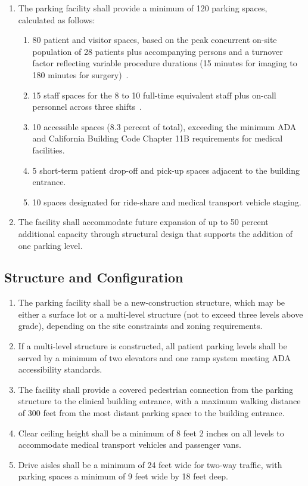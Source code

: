 \begin{enumerate}[label=(\alph*)]
\item The parking facility shall provide a minimum of 120 parking spaces,
  calculated as follows:
  \begin{enumerate}[label=(\arabic*)]
  \item 80 patient and visitor spaces, based on the peak concurrent on-site
    population of 28 patients plus accompanying persons and a turnover factor
    reflecting variable procedure durations (15 minutes for imaging to 180
    minutes for surgery)~\cite{newtrial2026,patientinstructions2026}.
  \item 15 staff spaces for the 8 to 10 full-time equivalent staff plus
    on-call personnel across three shifts~\cite{sitespec2026}.
  \item 10 accessible spaces (8.3 percent of total), exceeding the minimum
    ADA and California Building Code Chapter 11B requirements for medical
    facilities.
  \item 5 short-term patient drop-off and pick-up spaces adjacent to the
    building entrance.
  \item 10 spaces designated for ride-share and medical transport vehicle
    staging.
  \end{enumerate}

\item The facility shall accommodate future expansion of up to 50 percent
  additional capacity through structural design that supports the addition
  of one parking level.
\end{enumerate}

\subsection{Structure and Configuration}

\begin{enumerate}[label=(\alph*)]
\item The parking facility shall be a new-construction structure, which may be
  either a surface lot or a multi-level structure (not to exceed three levels
  above grade), depending on the site constraints and zoning requirements.

\item If a multi-level structure is constructed, all patient parking levels
  shall be served by a minimum of two elevators and one ramp system meeting
  ADA accessibility standards.

\item The facility shall provide a covered pedestrian connection from the
  parking structure to the clinical building entrance, with a maximum walking
  distance of 300 feet from the most distant parking space to the building
  entrance.

\item Clear ceiling height shall be a minimum of 8 feet 2 inches on all
  levels to accommodate medical transport vehicles and passenger vans.

\item Drive aisles shall be a minimum of 24 feet wide for two-way traffic,
  with parking spaces a minimum of 9 feet wide by 18 feet deep.
\end{enumerate}

